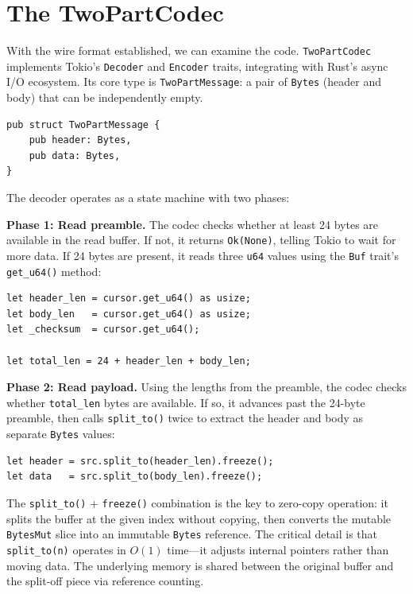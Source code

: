 \section{The TwoPartCodec}
\label{sec:codecs:twopart}

%
With the wire format established, we can examine the code. \texttt{Two\-Part\-Codec} implements Tokio's \texttt{Decoder} and \texttt{Encoder} traits, integrating with Rust's async I/O ecosystem. Its core type is \texttt{Two\-Part\-Message}: a pair of \texttt{Bytes} (header and body) that can be independently empty.

\begin{verbatim}
pub struct TwoPartMessage {
    pub header: Bytes,
    pub data: Bytes,
}
\end{verbatim}

The decoder operates as a state machine with two phases:

\textbf{Phase 1: Read preamble.} The codec checks whether at least 24 bytes are available in the read buffer. If not, it returns \texttt{Ok(None)}, telling Tokio to wait for more data. If 24 bytes are present, it reads three \texttt{u64} values using the \texttt{Buf} trait's \texttt{get\_u64()} method:

\begin{verbatim}
let header_len = cursor.get_u64() as usize;
let body_len   = cursor.get_u64() as usize;
let _checksum  = cursor.get_u64();

let total_len = 24 + header_len + body_len;
\end{verbatim}

\textbf{Phase 2: Read payload.} Using the lengths from the preamble, the codec checks whether \texttt{total\_len} bytes are available. If so, it advances past the 24-byte preamble, then calls \texttt{split\_to()} twice to extract the header and body as separate \texttt{Bytes} values:

\begin{verbatim}
let header = src.split_to(header_len).freeze();
let data   = src.split_to(body_len).freeze();
\end{verbatim}

The \texttt{split\_to()} + \texttt{freeze()} combination is the key to zero-copy operation: it splits the buffer at the given index without copying, then converts the mutable \texttt{BytesMut} slice into an immutable \texttt{Bytes} reference. The critical detail is that \texttt{split\_to(n)} operates in $O(1)$ time---it adjusts internal pointers rather than moving data. The underlying memory is shared between the original buffer and the split-off piece via reference counting.

